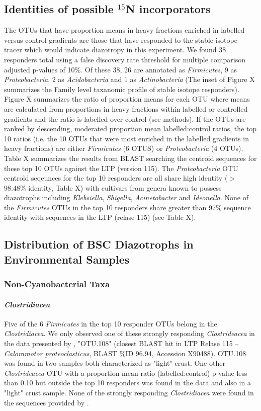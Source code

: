\subsection{Identities of possible $^{15}$N incorporators}
The OTUs that have proportion means in heavy fractions enriched in labelled versus control gradients are those that have responded to the stable isotope tracer which would indicate diazotropy in this experiment. We found 38 responders total using a false discovery rate threshold for multiple comparison adjusted p-values of 10\%. Of these 38, 26 are annotated as \textit{Firmicutes}, 9 as \textit{Proteobacteria}, 2 as \textit{Acidobacteria} and 1 as \textit{Actinobacteria} (The inset of Figure X summarizes the Family level taxanomic profile of stable isotope responders). Figure X summarizes the ratio of proportion means for each OTU where means are calculated from proportions in heavy fractions within labelled or controlled gradients and the ratio is labelled over control (see methods). If the OTUs are ranked by descending, moderated proportion mean labelled:control ratios, the top 10 ratios (i.e. the 10 OTUs that were most enriched in the labelled gradients in heavy fractions) are either \textit{Firmicutes} (6 OTUS) or \textit{Proteobacteria} (4 OTUs). Table X summarizes the results from BLAST searching the centroid sequences for these top 10 OTUs against the LTP (version 115). The \textit{Proteobacteria} OTU centrold seqeunces for the top 10 responders are all share high identity ($>$98.48\% identity, Table X) with cultivars from genera known to possess diazotrophs including \textit{Klebsiella}, \textit{Shigella}, \textit{Acinetobacter} and \textit{Ideonella}. None of the \textit{Firmicutes} OTUs in the top 10 responders share greater than 97\% sequence identity with sequences in the LTP (relase 115) (see Table X).

\subsection{Distribution of BSC Diazotrophs in Environmental Samples}
\subsubsection{Non-Cyanobacterial Taxa}
\paragraph{\textit{Clostridiacea}}
Five of the 6 \textit{Firmicutes} in the top 10 responder OTUs belong in the \textit{Clostridiacea}. We only observed one of these strongly responding \textit{Clostrideacea} in the data presented by \citet{Garcia_Pichel_2013}, "OTU.108" (closest BLAST hit in LTP Relase 115 -- \textit{Caloramotor proteoclasticus}, BLAST \%ID 96.94, Accession X90488). OTU.108 was found in two samples both characterized as "light" crust. One other \textit{Clostrideacea} OTU with a proportion mean ratio (labelled:control) p-value less than 0.10 but outside the top 10 responders was found in the \citet{Garcia_Pichel_2013} data and also in a "light" crust sample. None of the strongly responding \textit{Clostridiacea} were found in the sequences provided by \citet{Steven_2013}.

